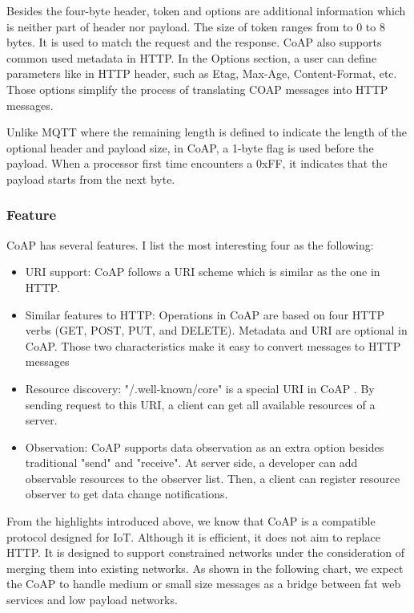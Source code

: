 \documentclass{Nan_Thesis}
\begin{document}
Besides the four-byte header, token and options are additional information which is neither part of header nor payload. The size of token ranges from to 0 to 8 bytes. It is used to match the request and the response. CoAP also supports common used metadata in HTTP. In the Options section, a user can define parameters like in HTTP header, such as Etag, Max-Age, Content-Format, etc. Those options simplify the process of translating COAP messages into HTTP messages.

Unlike MQTT where the remaining length is defined to indicate the length of the optional header and payload size, in CoAP, a 1-byte flag is used before the payload. When a processor first time encounters a 0xFF, it indicates that the payload starts from the next byte.
\subsubsection{Feature}
CoAP has several features. I list the most interesting four as the following:

\begin{itemize}
  \item URI support: CoAP follows a URI scheme which is similar as the one in HTTP.
  \item Similar features to HTTP: Operations in CoAP are based on four HTTP verbs (GET, POST, PUT, and DELETE). Metadata and URI are optional in CoAP. Those two characteristics make it easy to convert messages to HTTP messages 
  \item Resource discovery: "/.well-known/core" is a special URI in CoAP \cite{shelby2012constrained}. By sending request to this URI, a client can get all available resources of a server.
  \item Observation: CoAP supports data observation as an extra option besides traditional "send" and "receive". At server side, a developer can add observable resources to the observer list. Then, a client can register resource observer to get data change notifications.
\end{itemize}
 
From the highlights introduced above, we know that CoAP is a compatible protocol designed for IoT. Although it is efficient, it does not aim to replace HTTP. It is designed to support constrained networks under the consideration of merging them into existing networks. As shown in the following chart, we expect the CoAP to handle medium or small size messages as a bridge between fat web services and low payload networks.
\end{document}
